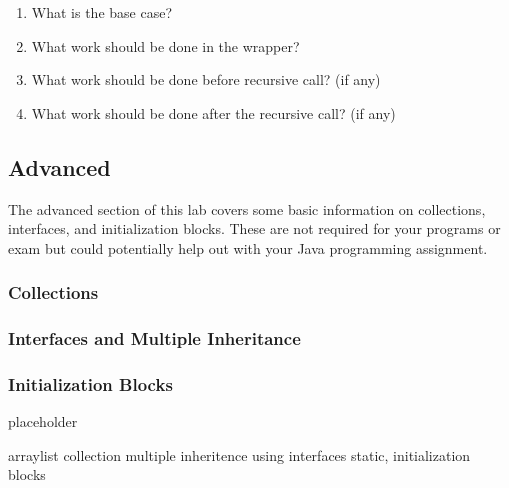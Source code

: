 \documentclass[../../main.tex]{subfiles}
\begin{document}
\begin{steps}
\begin{enumerate}[label=\Alph*.]
         \item What is the base case?\\
            \vspace{.5cm}
         \item What work should be done in the wrapper?\\
            \vspace{.5cm}
         \item What work should be done before recursive call? (if any)\\
            \vspace{.5cm}
         \item What work should be done after the recursive call? (if any)\\
            \vspace{.5cm}
      \end{enumerate}
\end{steps}

\subsection{Advanced}
The advanced section of this lab covers some basic information on collections, interfaces, and
initialization blocks. These are not required for your programs or exam but could potentially help out
with your Java programming assignment.
\subsubsection{Collections}
\subsubsection{Interfaces and Multiple Inheritance}
\subsubsection{Initialization Blocks}
\begin{steps}
   \item placeholder
\end{steps}

arraylist collection
multiple inheritence using interfaces
static, initialization blocks
\end{document}
